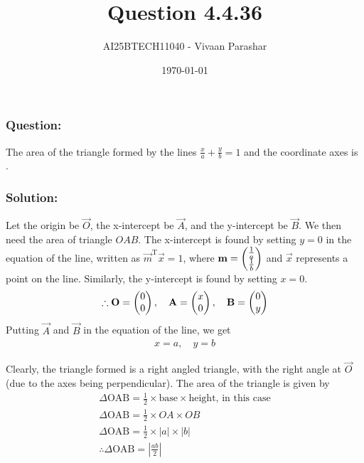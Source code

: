 \documentclass{beamer}
\title{Question 4.4.36}
\author{AI25BTECH11040 - Vivaan Parashar}
\date{\today}
\begin{document}
\frame{\titlepage}

\begin{frame}
    \frametitle{Question: }
    The area of the triangle formed by the lines $\frac{x}{a} + \frac{y}{b} = 1$ and the coordinate axes is \underline{\hspace{2cm}}.
\end{frame}

\begin{frame}
    \frametitle{Solution: }
    Let the origin be $\vec{O}$, the x-intercept be $\vec{A}$, and the y-intercept be $\vec{B}$. We then need the area of triangle $OAB$.
    The x-intercept is found by setting $y=0$ in the equation of the line, written as $\vec{m}^{\mathrm{T}}\vec{x} = 1$, where $\mathbf{m} = \begin{pmatrix}\frac{1}{a} \\ \frac{1}{b}\end{pmatrix}$ and $\vec{x}$ represents a point on the line. Similarly, the y-intercept is found by setting $x=0$.
    \begin{align}
        \therefore \mathbf{O} = \begin{pmatrix}0 \\ 0\end{pmatrix}, \quad \mathbf{A} = \begin{pmatrix}x \\ 0\end{pmatrix}, \quad \mathbf{B} = \begin{pmatrix}0 \\ y\end{pmatrix}
    \end{align}
    Putting $\vec{A}$ and $\vec{B}$ in the equation of the line, we get
    \begin{align}
        x = a, \quad y = b
    \end{align}
\end{frame}
\begin{frame}
    Clearly, the triangle formed is a right angled triangle, with the right angle at $\vec{O}$ (due to the axes being perpendicular). The area of the triangle is given by
    \begin{align}
        \Delta\text{OAB} = \frac{1}{2} \times \text{base} \times \text{height},\,\text{in this case} \\
        \Delta\text{OAB} = \frac{1}{2} \times OA \times OB                                           \\
        \Delta\text{OAB} = \frac{1}{2} \times |a| \times |b|                                         \\
        \therefore \Delta\text{OAB} = \left|\frac{ab}{2}\right|
    \end{align}
\end{frame}
\end{document}
